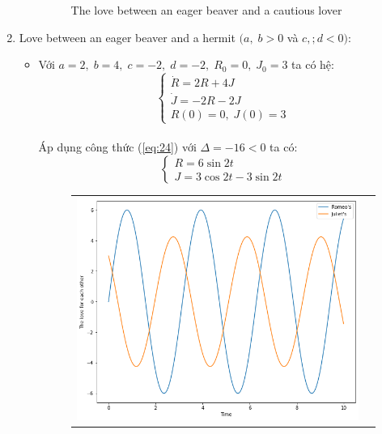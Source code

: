 \documentclass[a4paper]{article}
\begin{document}
\begin{enumerate}
\begin{itemize}
\begin{figure}[htp]
\begin{tabular}{cc}
        \end{tabular}
        \caption{The love between an eager beaver and a cautious lover}
    \end{figure}
    \end{itemize}
\newpage
\item
Love between an eager beaver and a hermit $(a,\;b > 0$ và $c,;d < 0)$:
    \begin{itemize}
    \item Với $a = 2,\;b = 4,\;c = -2,\;d = -2,\;R_0 = 0,\;J_0 = 3$ ta có hệ:
    $$\begin{cases} \dot{R}=2R+4J \\ \dot{J}=-2R-2J \\ R(0)=0,\;J(0)=3 \end{cases}$$ \\
    Áp dụng công thức (\ref{eq:24}) với $\Delta = -16 < 0$ ta có:
    $$\begin{cases}
        R = 6\sin{2t} \\
        J = 3\cos{2t} - 3\sin{2t}
    \end{cases}$$
    \begin{figure}[htp]
        \centering
        \begin{tabular}{cc}
            \includegraphics[scale = .33]{Images/Bt2/4.1_gr.png} &

\end{tabular}
\end{figure}
\end{itemize}
\end{enumerate}
\end{document}
